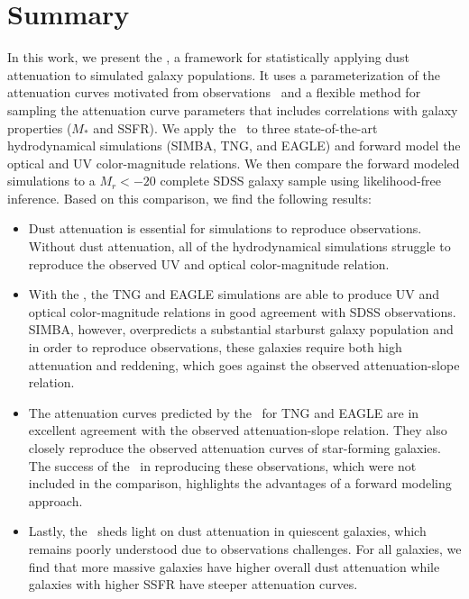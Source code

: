 \section{Summary}
In this work, we present the \eda, a framework for statistically applying dust
attenuation to simulated galaxy populations. It uses a parameterization of 
the attenuation curves motivated from observations~\citep{noll2009} and a
flexible method for sampling the attenuation curve parameters that includes
correlations with galaxy properties ($M_*$ and SSFR). We apply the \eda~to 
three state-of-the-art hydrodynamical simulations (SIMBA, TNG, and EAGLE) and
forward model the optical and UV color-magnitude relations. We then compare
the forward modeled simulations to a $M_r < -20$ complete SDSS galaxy sample  
using likelihood-free inference. Based on this comparison, we find the
following results: 

\begin{itemize}
    \item Dust attenuation is essential for simulations to reproduce observations.
        Without dust attenuation, all of the hydrodynamical simulations struggle
        to reproduce the observed UV and optical color-magnitude relation. 
    \item With the \eda, the TNG and EAGLE simulations are able to produce UV and
        optical color-magnitude relations in good agreement with SDSS observations. 
        SIMBA, however, overpredicts a substantial starburst galaxy population
        and in order to reproduce observations, these galaxies require
        both high attenuation and reddening, which goes against the observed 
        attenuation-slope relation. 
    \item The attenuation curves predicted by the \eda~for TNG and EAGLE are in
        excellent agreement with the observed attenuation-slope
        relation. They also closely reproduce the observed attenuation curves
        of star-forming galaxies. The success of the \eda~in reproducing these
        observations, which were not included in the comparison, highlights the 
        advantages of a forward modeling approach. 
    \item Lastly, the \eda~sheds light on dust attenuation in quiescent
        galaxies, which remains poorly understood due to observations
        challenges. 
        For all galaxies, we find that more massive galaxies have higher overall dust
        attenuation while galaxies with higher SSFR have steeper attenuation
        curves. 
\end{itemize}

